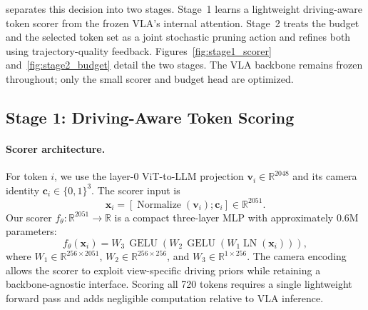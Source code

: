 \documentclass[letterpaper]{article} %
\begin{document}
\ours{} separates this decision into two stages. Stage~1 learns a lightweight
driving-aware token scorer from the frozen VLA's internal attention. Stage~2
treats the budget and the selected token set as a joint stochastic pruning
action and refines both using trajectory-quality feedback.
Figures~\ref{fig:stage1_scorer} and~\ref{fig:stage2_budget} detail the two
stages. The VLA backbone remains frozen throughout; only the small scorer and
budget head are optimized.

\subsection{Stage 1: Driving-Aware Token Scoring}
\label{sec:sft}

\paragraph{Scorer architecture.}
For token $i$, we use the layer-0 ViT-to-LLM projection
$\mathbf{v}_i\in\mathbb{R}^{2048}$ and its camera identity
$\mathbf{c}_i\in\{0,1\}^{3}$. The scorer input is
\begin{equation}
    \mathbf{x}_i =
    [\operatorname{Normalize}(\mathbf{v}_i);\mathbf{c}_i]
    \in\mathbb{R}^{2051}.
\end{equation}
Our scorer $f_\theta:\mathbb{R}^{2051}\to\mathbb{R}$ is a compact three-layer
MLP with approximately $0.6$M parameters:
\begin{equation}
 f_\theta(\mathbf{x}_i) =
 W_3\,\operatorname{GELU}\!\left(
 W_2\,\operatorname{GELU}\!\left(
 W_1\operatorname{LN}(\mathbf{x}_i)
 \right)\right),
\end{equation}
where $W_1\in\mathbb{R}^{256\times2051}$,
$W_2\in\mathbb{R}^{256\times256}$, and
$W_3\in\mathbb{R}^{1\times256}$. The camera encoding allows the scorer to
exploit view-specific driving priors while retaining a backbone-agnostic
interface. Scoring all 720 tokens requires a single lightweight forward pass
and adds negligible computation relative to VLA inference.
\end{document}
